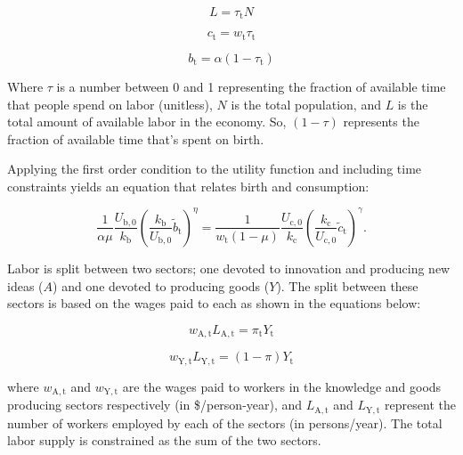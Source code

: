 \documentclass[letterpaper,12pt]{article}
\begin{document}
\begin{equation}\label{eq:pop_work}
	L = \tau_\mathrm{t} N
\end{equation}

\begin{equation} \label{eq:consumption_constraint}
	c_\mathrm{t} = w_\mathrm{t} \tau_\mathrm{t}
\end{equation}

\begin{equation} \label{eq:birth_constraint}
	b_\mathrm{t} = \alpha (1-\tau_\mathrm{t})
\end{equation}

Where $\tau$ is a number between 0 and 1 representing the fraction of available time that people spend on labor (unitless), $N$ is the total population, and $L$ is the total amount of available labor in the economy. So, $(1-\tau)$ represents the fraction of available time that's spent on birth.

Applying the first order condition to the utility function and including time constraints yields an equation that relates birth and consumption:

\begin{equation} \label{eq:FOC_and_time_constraints}
	\frac{1}{\alpha \mu} \frac{U_\mathrm{b,0}}{k_\mathrm{b}} \left( \frac{k_\mathrm{b}}{U_\mathrm{b,0}} \tilde b_\mathrm{t} \right) ^{\eta} 
	= \frac{1}{w_\mathrm{t}(1-\mu)} \frac{U_\mathrm{c,0}}{k_\mathrm{c}}  \left( \frac{k_\mathrm{c}}{U_\mathrm{c,0}} \tilde c_\mathrm{t} \right)^\gamma .
\end{equation}

Labor is split between two sectors; one devoted to innovation and producing new ideas ($A$) and one devoted to producing goods ($Y$). The split between these sectors is based on the wages paid to each as shown in the equations below:

\begin{equation} \label{eq:knowledge_comp}
	w_\mathrm{A,t} L_\mathrm{A,t} = \pi_\mathrm{t} Y_\mathrm{t}
\end{equation}

\begin{equation} \label{eq:labor_comp}
	w_\mathrm{Y,t} L_\mathrm{Y,t} = (1-\pi) Y_\mathrm{t}
\end{equation}

\noindent where $w_\mathrm{A,t}$ and $w_\mathrm{Y,t}$ are the wages paid to workers in the knowledge and goods producing sectors respectively (in \$/person-year), and $L_\mathrm{A,t}$ and $L_\mathrm{Y,t}$ represent the number of workers employed by each of the sectors (in persons/year). The total labor supply is constrained as the sum of the two sectors.
\end{document}
